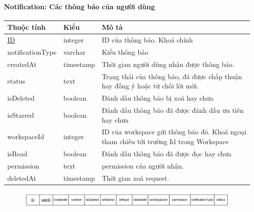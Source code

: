 \paragraph{Notification: Các thông báo của người dùng}
\begin{center}
\begin{tabular}{ |p{3cm} |p{3cm} |p{9cm}|} 
 \hline
    Thuộc tính & Kiểu & Mô tả \\ [0.5ex] 
 \hline
 \underline{ID} & integer & ID của thông báo. Khoá chính \\ 
 \hline
 notificationType & varchar & Kiểu thông báo \\
 \hline
 createdAt & timestamp & Thời gian người dùng nhận được thông báo.\\
 \hline
 status & text & Trạng thái của thông báo, đã được chấp thuận hay đồng ý hoặc từ chối lời mời.\\
 \hline
 isDeleted & boolean & Đánh dấu thông báo bị xoá hay chưa \\
 \hline
 isStarred & boolean & Đánh dấu thông báo đã được đánh dấu ưu tiên hay chưa \\
 \hline
 workspaceId & integer & ID của workspace gửi thông báo đó. Khoá ngoại tham chiếu tới trường Id trong Workspace \\
 \hline
  isRead & boolean & Đánh dấu thông báo đã được đọc hay chưa \\
 \hline
  permission & text & permission của người nhận. \\
 \hline
  deletedAt & timestamp & Thời gian xoá request. \\
 \hline
\end{tabular}
\end{center}
\begin{figure}[h]
        \centering
        \includegraphics[width=\textwidth]{Content/Phân tích và thiết kế hệ thống/images/ERD_mapping/notification_mapping.png}
        \label{fig:enter-label}
\end{figure}